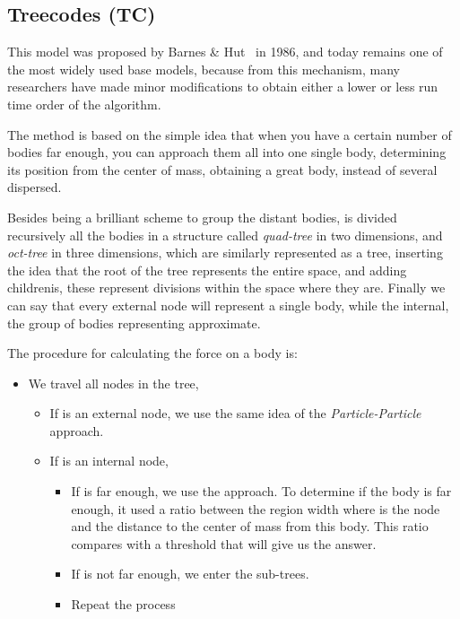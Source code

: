 \subsection{Treecodes (TC)}

This model was proposed by Barnes \& Hut~\cite{treecode} in 1986,
and today remains one of the most widely used base models,
because from this mechanism, many researchers have made minor
modifications to obtain either a lower or less run time order
of the algorithm.

The method is based on the simple idea that when you have a certain
number of bodies far enough, you can approach them all into one single body,
determining its position from the center of mass, obtaining a great body,
instead of several dispersed.

Besides being a brilliant scheme to group the distant bodies,
is divided recursively all the bodies in a structure called \emph{quad-tree}
in two dimensions, and \emph{oct-tree} in three dimensions, which are similarly
represented as a tree, inserting the idea that the root of the tree represents
the entire space, and adding childrenis, these represent divisions
within the space where they are.
Finally we can say that every external node
will represent a single body, while the internal,
the group of bodies representing approximate.

The procedure for calculating the force on a body is:
\begin{itemize}
    \item We travel all nodes in the tree,
    \begin{itemize}
        \item If is an external node, we use the same idea of the \emph{Particle-Particle} approach.
        \item If is an internal node,
        \begin{itemize}
            \item If is far enough, we use the approach.
                  To determine if the body is far enough,
                  it used a ratio between the region width where is the
                  node and the distance to the center of mass from this body.
                  This ratio compares with a threshold that will give us the answer.
            \item If is not far enough, we enter the sub-trees.
            \item Repeat the process
        \end{itemize}
    \end{itemize}
\end{itemize}

